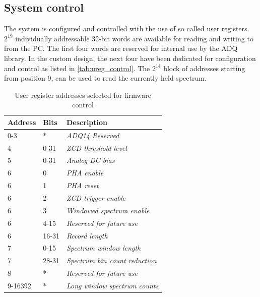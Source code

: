 \subsection{System control}

The system is configured and controlled with the use of so called 
user registers. $2^{19}$ individually addressable 32-bit words
are available for reading and writing to from the PC. The first
four words are reserved for internal use by the ADQ library. 
In the custom design, the next four have been 
dedicated for configuration and control as listed in \autoref{tab:ureg_control}.
The $2^{14}$ block of addresses starting from position 9, can
be used to read the currently held spectrum.

\begin{table}[H]
\caption{User register addresses selected for firmware control}
\centering
  \begin{tabular}{l | l | l}
  {\bfseries Address} & {\bfseries Bits} & {\bfseries Description}\\
  \hline
  0-3  & *      & \textit {ADQ14 Reserved}\\ \hline
  4    & 0-31       & \textit {ZCD threshold level}\\ \hline
  5    & 0-31       & \textit {Analog DC bias}\\ \hline
  6    & 0       & \textit {PHA enable}\\ \hline
  6    & 1       & \textit {PHA reset}\\ \hline
  6    & 2       & \textit {ZCD trigger enable}\\ \hline
  6    & 3       & \textit {Windowed spectrum enable}\\ \hline
  6    & 4-15  & \textit {Reserved for future use}\\ \hline
  6    & 16-31   & \textit {Record length}\\ \hline
  7    & 0-15   & \textit {Spectrum window length}\\ \hline
  7    & 28-31   & \textit {Spectrum bin count reduction}\\ \hline
  8    & *  & \textit {Reserved for future use}\\ \hline
  9-16392    & *   & \textit {Long window spectrum counts}\\ 
  \end{tabular}
  \label{tab:ureg_control}
\end{table}


